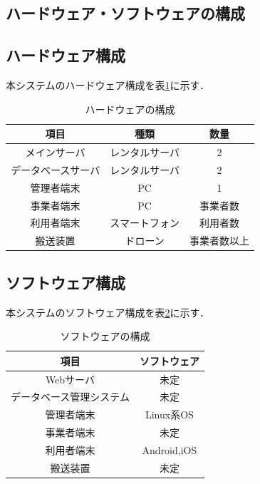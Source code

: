 \documentclass[a4paper, titlepage]{jsarticle}
\begin{document}
\begin{itemize}
\section{ハードウェア・ソフトウェアの構成}
\subsection{ハードウェア構成}
本システムのハードウェア構成を表\ref{fig:hardware}に示す．
\begin{table}[H]
 \begin{center}
  \caption{ハードウェアの構成}
    \label{fig:hardware}
  \begin{tabular}{ccc} \hline
    項目 & 種類 & 数量 \\ \hline \hline
    メインサーバ & レンタルサーバ & 2 \\
    データベースサーバ & レンタルサーバ & 2 \\
    管理者端末 & PC & 1 \\
    事業者端末 & PC & 事業者数 \\
    利用者端末 & スマートフォン & 利用者数 \\
    搬送装置 & ドローン & 事業者数以上 \\ \hline
  \end{tabular}
 \end{center}
\end{table}
\subsection{ソフトウェア構成}
本システムのソフトウェア構成を表\ref{fig:software}に示す．
\begin{table}[H]
 \begin{center}
  \caption{ソフトウェアの構成}
    \label{fig:software}
  \begin{tabular}{cc} \hline
    項目 & ソフトウェア \\ \hline \hline
    Webサーバ & 未定 \\
    データベース管理システム & 未定 \\
    管理者端末 & Linux系OS \\
    事業者端末 & 未定 \\
    利用者端末 & Android,iOS \\
    搬送装置 & 未定 \\ \hline
  \end{tabular}
 \end{center}
\end{table}


\end{itemize}
\end{document}
